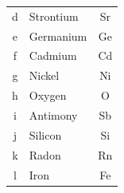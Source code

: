 \begin{exercise}
\begin{solu}
\begin{center}
\begin{tabular}{@{}clc@{}}
                d & Strontium & Sr \\[3pt]
                e & Germanium & Ge \\[3pt]
                f & Cadmium & Cd \\[3pt]
                g & Nickel & Ni \\[3pt]
                h & Oxygen & O \\[3pt]
                i & Antimony & Sb \\[3pt]
                j & Silicon & Si \\[3pt]
                k & Radon & Rn \\[3pt]
                l & Iron & Fe \\
                \bottomrule
            \end{tabular}
        \end{center}
    \end{solu}
\end{exercise}

